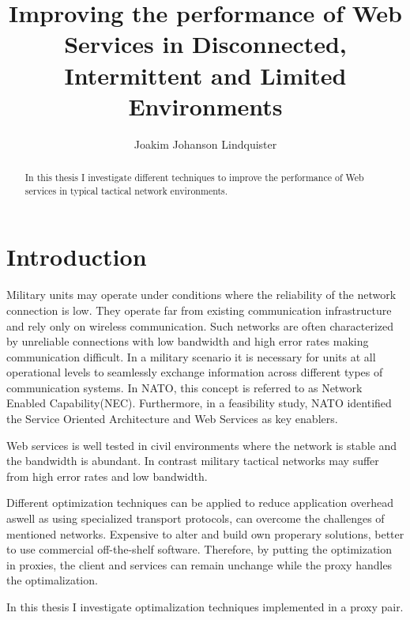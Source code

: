 \documentclass[USenglish]{article}
\title{Improving the performance of Web Services in Disconnected, Intermittent and Limited Environments}
\author{Joakim Johanson Lindquister}
\begin{document}
\ififorside{}

\begin{abstract}
In this thesis I investigate different techniques to improve the performance of Web services in typical tactical network environments.
\end{abstract}
\pagebreak

\tableofcontents
\listoftables
\listoffigures

\pagebreak


\part{Introduction}
Military units may operate under conditions where the reliability of the network connection is low. They operate far from existing communication infrastructure and rely only on wireless communication. Such networks are often characterized by unreliable connections with low bandwidth and high error rates making communication difficult. In a military scenario it is necessary for units at all operational levels to seamlessly exchange information across different types of communication systems. In NATO, this concept is referred to as Network Enabled Capability(NEC). Furthermore, in a feasibility study, NATO identified the Service Oriented Architecture and Web Services as key enablers\cite{nnec-study}.

Web services is well tested in civil environments where the network is stable and the bandwidth is abundant. In contrast military tactical networks may suffer from high error rates and low bandwidth.

Different optimization techniques can be applied to reduce application overhead aswell as using specialized transport protocols, can overcome the challenges of mentioned networks.
Expensive to alter and build own properary solutions, better to use commercial off-the-shelf software. Therefore, by putting the optimization in proxies, the client and services can remain unchange while the proxy handles the optimalization.

In this thesis I investigate optimalization techniques implemented in a proxy pair.

\end{document}
